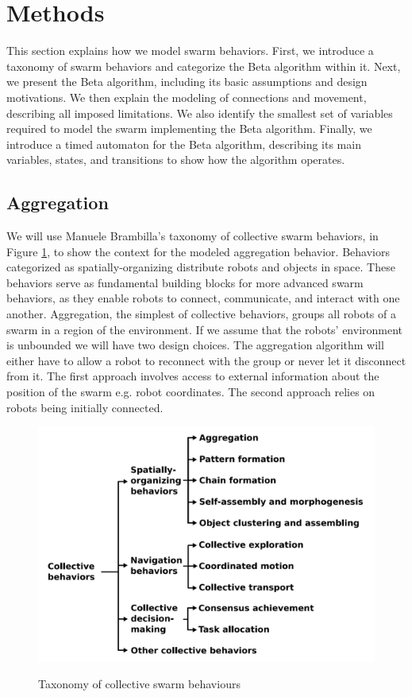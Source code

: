 \section{Methods}
This section explains how we model swarm behaviors. First, we introduce a taxonomy of swarm behaviors and categorize the Beta algorithm within it. Next, we present the Beta algorithm, including its basic assumptions and design motivations. We then explain the modeling of connections and movement, describing all imposed limitations. We also identify the smallest set of variables required to model the swarm implementing the Beta algorithm. Finally, we introduce a timed automaton for the Beta algorithm, describing its main variables, states, and transitions to show how the algorithm operates.

\subsection{Aggregation}
We will use Manuele Brambilla's \cite{Brambilla2013} taxonomy of collective swarm behaviors, in Figure \ref{fig:taxonomy}, to show the context for the modeled aggregation behavior. Behaviors categorized as spatially-organizing distribute robots and objects in space. These behaviors serve as fundamental building blocks for more advanced swarm behaviors, as they enable robots to connect, communicate, and interact with one another. Aggregation, the simplest of collective behaviors, groups all robots of a swarm in a region of the environment. If we assume that the robots' environment is unbounded we will have two design choices. The aggregation algorithm will either have to allow a robot to reconnect with the group or never let it disconnect from it. The first approach involves access to external information about the position of the swarm e.g. robot coordinates. The second approach relies on robots being initially connected.

\begin{figure}[]
\caption{Taxonomy of collective swarm behaviours \cite{Brambilla2013}}
\includegraphics[width=\textwidth]{images/taxonomy.png}
\label{fig:taxonomy}
\end{figure}

